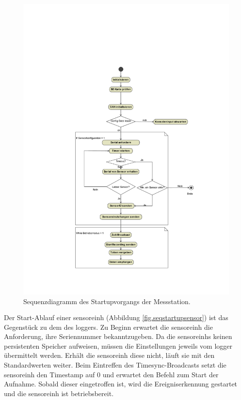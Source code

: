 \begin{figure}
	\centering
		\includegraphics[height=0.9\textheight]{images/magicdraw/AblaufLogger.pdf}
	\caption{Sequenzdiagramm des Startupvorgangs der Messstation.}
	\label{fig.seqstartuplogger}
\end{figure}

Der Start-Ablauf einer \gls{sensoreinh} (Abbildung \ref{fig.seqstartupsensor}) ist das Gegenstück zu dem des \gls{logger}s. Zu Beginn erwartet die \gls{sensoreinh} die Anforderung, ihre Seriennummer bekanntzugeben. Da die \glspl{sensoreinh} keinen persistenten Speicher aufweisen, müssen die Einstellungen jeweils vom  \gls{logger} übermittelt werden. Erhält die \gls{sensoreinh} diese nicht, läuft sie mit den Standardwerten weiter. Beim Eintreffen des Timesync-Broadcasts setzt die \gls{sensoreinh} den Timestamp auf 0 und erwartet den Befehl zum Start der Aufnahme. Sobald dieser eingetroffen ist, wird die Ereigniserkennung gestartet und die \gls{sensoreinh} ist betriebsbereit.

